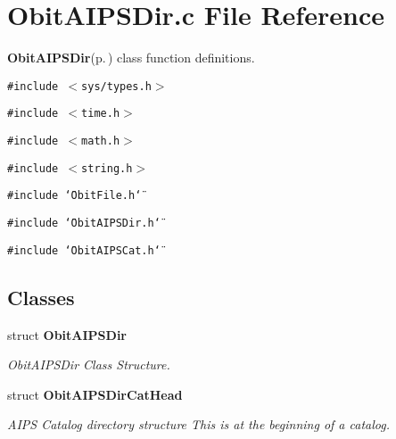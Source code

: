 \section{Obit\-AIPSDir.c File Reference}
\label{ObitAIPSDir_8c}
{\bf Obit\-AIPSDir}{\rm (p.\,\pageref{structObitAIPSDir})} class function definitions. 

{\tt \#include $<$sys/types.h$>$}\par
{\tt \#include $<$time.h$>$}\par
{\tt \#include $<$math.h$>$}\par
{\tt \#include $<$string.h$>$}\par
{\tt \#include \char`\"{}Obit\-File.h\char`\"{}}\par
{\tt \#include \char`\"{}Obit\-AIPSDir.h\char`\"{}}\par
{\tt \#include \char`\"{}Obit\-AIPSCat.h\char`\"{}}\par
\subsection*{Classes}
\begin{CompactItemize}
\item 
struct {\bf Obit\-AIPSDir}
\begin{CompactList}\small\item\em Obit\-AIPSDir Class Structure. \item\end{CompactList}\item 
struct {\bf Obit\-AIPSDir\-Cat\-Head}
\begin{CompactList}\small\item\em AIPS Catalog directory structure This is at the beginning of a catalog. \item\end{CompactList}\end{CompactItemize}
